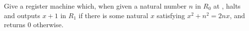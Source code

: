 \begin{problem}
  Give a register machine which, when given a natural number $n$ in
  $R_0$ at , halts and outputs $x + 1$ in $R_1$
  if there is some natural $x$ satisfying $x^2 + n^2 = 2nx$,
  and returns $0$ otherwise.

  \begin{answer}
    
  \end{answer}
\end{problem}
